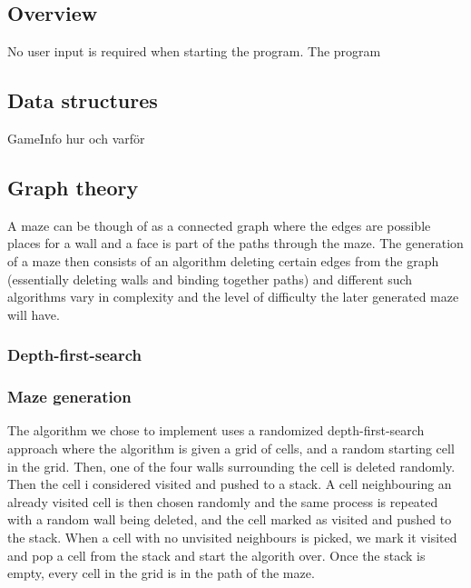 \documentclass[12pt, a4paper]{article}
\begin{document}
\subsection{Overview}
No user input is required when starting the program. The program 

\subsection{Data structures}
GameInfo hur och varför

\subsection{Graph theory}
A maze can be though of as a connected graph where the edges are possible places for a wall and a face is part of the paths through the maze. The generation of a maze then consists of an algorithm deleting certain edges from the graph (essentially deleting walls and binding together paths) and different such algorithms vary in complexity and the level of difficulty the later generated maze will have. 


\subsubsection{Depth-first-search}


\subsubsection{Maze generation}
The algorithm we chose to implement uses a randomized depth-first-search approach where the algorithm is given a grid of cells, and a random starting cell in the grid. Then, one of the four walls surrounding the cell is deleted randomly. Then the cell i considered visited and pushed to a stack. A cell neighbouring an already visited cell is then chosen randomly and the same process is repeated with a random wall being deleted, and the cell marked as visited and pushed to the stack. When a cell with no unvisited neighbours is picked, we mark it visited and pop a cell from the stack and start the algorith over. Once the stack is empty, every cell in the grid is in the path of the maze. 



    
\end{document}
